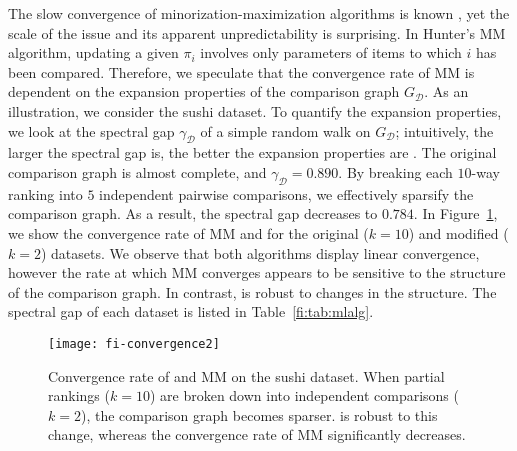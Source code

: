 The slow convergence of minorization-maximization algorithms is known \cite{hunter2004mm}, yet the scale of the issue and its apparent unpredictability is surprising.
In Hunter's MM algorithm, updating a given $\pi_i$ involves only parameters of items to which $i$ has been compared.
Therefore, we speculate that the convergence rate of MM is dependent on the expansion properties of the comparison graph $G_{\mathcal{D}}$.
As an illustration, we consider the sushi dataset.
To quantify the expansion properties, we look at the spectral gap $\gamma_{\mathcal{D}}$ of a simple random walk on $G_{\mathcal{D}}$;
intuitively, the larger the spectral gap is, the better the expansion properties are \citep{levin2008markov}.
The original comparison graph is almost complete, and $\gamma_{\mathcal{D}} = 0.890$.
By breaking each $10$-way ranking into $5$ independent pairwise comparisons, we effectively sparsify the comparison graph.
As a result, the spectral gap decreases to $0.784$.
In Figure~\ref{fi:fig:convergence}, we show the convergence rate of MM and \ILSR{} for the original ($k = 10$) and modified ($k = 2$) datasets.
We observe that both algorithms display linear convergence, however the rate at which MM converges appears to be sensitive to the structure of the comparison graph.
In contrast, \ILSR{} is robust to changes in the structure.
The spectral gap of each dataset is listed in Table~\ref{fi:tab:mlalg}.


\begin{figure}[ht]
\centering
\texttt{[image: fi-convergence2]}
\caption{
Convergence rate of \ILSR{} and MM on the sushi dataset.
When partial rankings ($k = 10$) are broken down into independent comparisons ($k = 2$), the comparison graph becomes sparser.
\ILSR{} is robust to this change, whereas the convergence rate of MM significantly decreases.
}
\label{fi:fig:convergence}
\end{figure}
